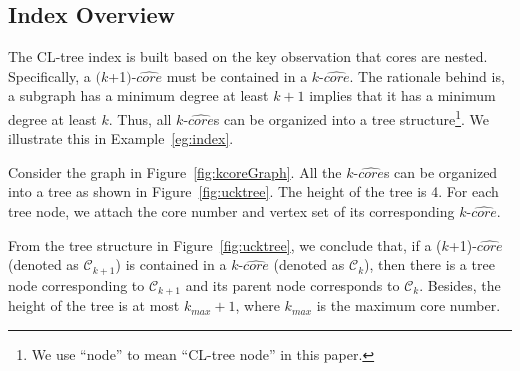 \subsection{Index Overview}
\label{indexIntro}
The CL-tree index is built based on the key observation that cores are nested.
Specifically, a $(k$+1$)$-$\widehat {core}$ must be contained in a $k$-$\widehat{core}$.
The rationale behind is, a subgraph has a minimum degree at least $k+1$ implies that
it has a minimum degree at least $k$. Thus, all $k$-$\widehat {core}$s can be organized into a tree structure\footnote{We use ``node'' to mean ``CL-tree node'' in this paper.}. We illustrate this in Example~\ref{eg:index}.

\begin{example}
\label{eg:index}
Consider the graph in Figure~\ref{fig:kcoreGraph}.
All the $k$-$\widehat {core}$s can be organized into a tree as shown in Figure~\ref{fig:ucktree}.
The height of the tree is 4.
For each tree node, we attach the core number and vertex set of its corresponding $k$-$\widehat {core}$.
\end{example}

From the tree structure in Figure~\ref{fig:ucktree}, we conclude that,
if a ($k$+1)-$\widehat {core}$ (denoted as ${\mathcal C}_{k+1}$)
is contained in a $k$-$\widehat {core}$ (denoted as ${\mathcal C}_k$),
then there is a tree node corresponding to ${\mathcal C}_{k+1}$ and its parent node corresponds to ${\mathcal C}_k$.
Besides, the height of the tree is at most $k_{max}+1$, where $k_{max}$ is the maximum core number.

